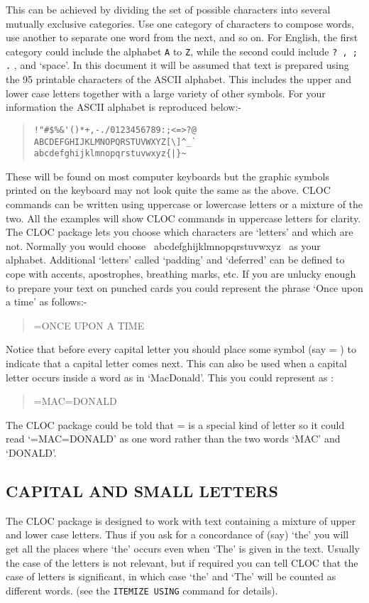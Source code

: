 This can be achieved by dividing the set of possible characters into
several mutually exclusive categories.  Use one category of characters
to compose words, use another to separate one word from the next,
and so on.  For English, the first category could include the
alphabet \verb/A/ to \verb/Z/, while the second could include
\verb/? , ; ./ , and `space'.
In this document it will be assumed that text is prepared using the 95
printable characters of the ASCII alphabet. This includes the upper and
lower case letters together with a large variety of other symbols. For
your information the ASCII alphabet is reproduced below:-
\begin{quote}
\begin{verbatim}
!"#$%&'()*+,-./0123456789:;<=>?@
ABCDEFGHIJKLMNOPQRSTUVWXYZ[\]^_`
abcdefghijklmnopqrstuvwxyz{|}~
\end{verbatim}
\end{quote}
These will be found on most computer keyboards but the graphic symbols
printed on the keyboard may not look quite the same as the above.
CLOC commands can be written using uppercase or lowercase
letters or a mixture of the two. All the examples will show CLOC commands
in uppercase letters for clarity.
The CLOC package lets you choose which characters are `letters' and
which are not. Normally you would choose ~abcdefghijklmnopqrstuvwxyz~ as
your alphabet. Additional `letters' called `padding' and `deferred'
can be defined to cope with accents, apostrophes, breathing marks, etc.
If you are unlucky enough to prepare your text on
punched cards you could represent the phrase `Once upon a time' as follows:-
\begin{quote}
\begin{verbatim*}
=ONCE UPON A TIME
\end{verbatim*}
\end{quote}
Notice that before every capital letter you should place some symbol
(say = ) to indicate that a capital letter comes next. This can also
be used when a capital letter occurs inside a word as in `MacDonald'.
This you could represent as :
\begin{quote}
\begin{verbatim*}
=MAC=DONALD
\end{verbatim*}
\end{quote}
The CLOC package could be told that = is a special kind of letter so
it could read `=MAC=DONALD' as one word rather than the two words
`MAC' and `DONALD'.

\subsection{CAPITAL AND SMALL LETTERS}
The CLOC package is designed to work with text containing a mixture of
upper and lower case letters. Thus if you ask for a concordance of
(say) `the' you will get all the places where `the' occurs even when
`The' is given in the text. Usually the case of the letters is not
relevant, but if required you can tell CLOC that the case of letters
is significant, in which case `the' and `The' will be counted as
different words. (see the \verb/ITEMIZE USING/ command for details).


